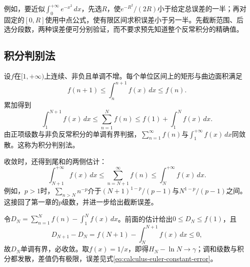 例如，要近似\(\int_0^{+\infty}e^{-x^2}\,dx\)，先选\(R\)，使\(e^{-R^2}/(2R)\)小于给定总误差的一半；再对固定的\([0,R]\)使用中点公式，使有限区间求积误差小于另一半。先截断范围、后选分段数，两种误差便可分别验证，而不要求预先知道整个反常积分的精确值。

\subsection{积分判别法}

设\(f\)在\([1,+\infty)\)上连续、非负且单调不增。每个单位区间上的矩形与曲边面积满足
\begin{equation*}
 f(n+1)\le\int_n^{n+1}f(x)\,dx\le f(n).
\end{equation*}
累加得到
\begin{equation*}
 \int_1^{N+1}f(x)\,dx\le\sum_{n=1}^Nf(n)
 \le f(1)+\int_1^Nf(x)\,dx.
\end{equation*}
由正项级数与非负反常积分的单调有界判据，\(\sum_{n=1}^{\infty}f(n)\)与\(\int_1^{+\infty}f(x)\,dx\)同敛散。这称为{\heiti{}积分判别法}。

收敛时，还得到尾和的两侧估计：
\begin{equation*}
 \int_{N+1}^{+\infty}f(x)\,dx
 \le\sum_{n=N+1}^{\infty}f(n)
 \le\int_N^{+\infty}f(x)\,dx.
\end{equation*}
例如，\(p>1\)时，\(\sum_{n>N}n^{-p}\)介于\((N+1)^{1-p}/(p-1)\)与\(N^{1-p}/(p-1)\)之间。这接回了第一章的\(p\)级数，并进一步给出截断误差。

令\(D_N=\sum_{n=1}^Nf(n)-\int_1^Nf(x)\,dx\)。前面的估计给出\(0\le D_N\le f(1)\)，且
\begin{equation*}
 D_{N+1}-D_N=f(N+1)-\int_N^{N+1}f(x)\,dx\le0,
\end{equation*}
故\(D_N\)单调有界，必收敛。取\(f(x)=1/x\)，即得\(H_N-\ln N\to\gamma\)；调和级数与积分都发散，差值仍有极限，误差见式\eqref{eq:calculus-euler-constant-error}。

